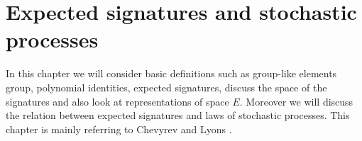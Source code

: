 \documentclass[12pt,a4paper]{report}
\theoremstyle{definition}
\begin{document}
\chapter{Expected signatures and stochastic processes}




In this chapter we will consider basic definitions such as group-like elements group, polynomial identities, expected signatures, discuss the space of the signatures and also look at representations of space $E$. Moreover we will discuss the relation between expected signatures and laws of stochastic processes. This chapter is mainly referring to Chevyrev and  Lyons \parencite{chevyrev2016characteristic}.

\end{document}
